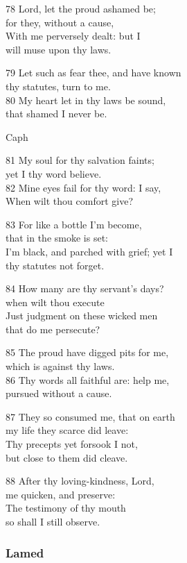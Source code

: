 \begin{multicols}{3}
78 Lord, let the proud ashamed be;\\
for they, without a cause,\\
With me perversely dealt: but I\\
will muse upon thy laws.

79 Let such as fear thee, and have known\\
thy statutes, turn to me.\\
80 My heart let in thy laws be sound,\\
that shamed I never be.


Caph

81 My soul for thy salvation faints;\\
yet I thy word believe.\\
82 Mine eyes fail for thy word: I say,\\
When wilt thou comfort give?

83 For like a bottle I’m become,\\
that in the smoke is set:\\
I’m black, and parched with grief; yet I\\
thy statutes not forget.

84 How many are thy servant’s days?\\
when wilt thou execute\\
Just judgment on these wicked men\\
that do me persecute?

85 The proud have digged pits for me,\\
which is against thy laws.\\
86 Thy words all faithful are: help me,\\
pursued without a cause.

87 They so consumed me, that on earth\\
my life they scarce did leave:\\
Thy precepts yet forsook I not,\\
but close to them did cleave.

88 After thy loving-kindness, Lord,\\
me quicken, and preserve:\\
The testimony of thy mouth\\
so shall I still observe.

\subsubsection*{Lamed}


\end{multicols}
